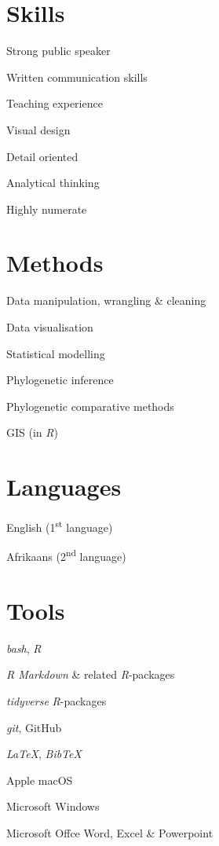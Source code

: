\documentclass[10pt]{article}
\begin{document}
\begin{multicols}{2}

\section*{Skills} %

Strong public speaker

Written communication skills

Teaching experience

Visual design

Detail oriented

Analytical thinking

Highly numerate

\section*{Methods} %

Data manipulation, wrangling \& cleaning

Data visualisation

Statistical modelling

Phylogenetic inference

Phylogenetic comparative methods

GIS (in \textit{R})

\columnbreak

\section*{Languages} %

English (1\textsuperscript{st} language)

Afrikaans (2\textsuperscript{nd} language)

\section*{Tools} %

\textit{bash}, \textit{R}

\textit{R Markdown} \& related \textit{R}-packages

\textit{tidyverse} \textit{R}-packages

\textit{git}, GitHub

\textit{LaTeX}, \textit{BibTeX}

Apple macOS

Microsoft Windows

Microsoft Offce Word, Excel \& Powerpoint

\end{multicols}
\end{document}
